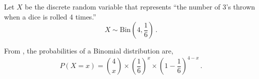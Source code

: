 %
%


\begin{subquestions}
	
\subquestion

Let $X$ be the discrete random variable that represents ``the number of 3's thrown when a dice is rolled 4 times.'' 
\begin{equation}
	X \sim \text{Bin}\left(4, \frac{1}{6}\right) \,.
\end{equation}

From , the probabilities of a Binomial distribution are,
\begin{equation}
	P(X = x) = { 4 \choose x} \times \left(\frac{1}{6} \right)^x \times \left(1-\frac{1}{6} \right)^{4-x} \,. \label{2008M:q3:BinEqn1}
\end{equation}
	

\end{subquestions}
